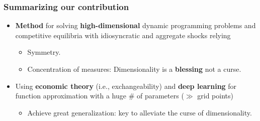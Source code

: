 \documentclass[aspectratio=169,10pt]{beamer}
\newcommand{\emphcolor}[1]{\textbf{\textcolor{emphcolorval}{#1}}}
\begin{document}
			
			
			
			
			\begin{frame}
				\frametitle{Summarizing our contribution}
			\begin{itemize}
				
				\item \emphcolor{Method} for solving \emphcolor{high-dimensional} dynamic programming problems and competitive equilibria with idiosyncratic and aggregate shocks relying\vspace{0.1in}
				\begin{itemize}
					\item Symmetry. \vspace{0.1in}
					\item Concentration of measures: Dimensionality is a \emphcolor{blessing} not a curse.\vspace{0.1in}
				\end{itemize}

				\item Using \emphcolor{economic theory} (i.e., exchangeability) and \emphcolor{deep learning} for function approximation with a huge \# of parameters ($\gg$ grid points)\vspace{0.1in}
			      \begin{itemize}
				 	\item Achieve great generalization: key to alleviate the curse of dimensionality.\vspace{0.1in}
				 \end{itemize}
				

\end{itemize}
\end{frame}
\end{document}
